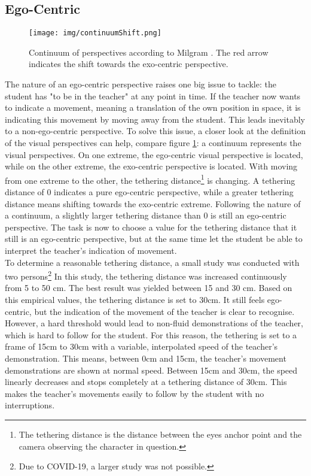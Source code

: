 \subsection{Ego-Centric}
\begin{figure}
	\centering
	\texttt{[image: img/continuumShift.png]}
	\caption{Continuum of perspectives according to Milgram \cite{Milgram1994}. The red arrow indicates the shift towards the exo-centric perspective.}
	\label{fig:continuumShift}
\end{figure}
The nature of an ego-centric perspective raises one big issue to tackle: the student has "to be in the teacher" at any point in time. If the teacher now wants to indicate a movement, meaning a translation of the own position in space, it is indicating this movement by moving away from the student. This leads inevitably to a non-ego-centric perspective. To solve this issue, a closer look at the definition of the visual perspectives can help, compare figure \ref{fig:continuumShift}: a continuum represents the visual perspectives. On one extreme, the ego-centric visual perspective is located, while on the other extreme, the exo-centric perspective is located. With moving from one extreme to the other, the tethering distance\footnote{The tethering distance is the distance between the eyes anchor point and the camera observing the character in question.} is changing. A tethering distance of 0 indicates a pure ego-centric perspective, while a greater tethering distance means shifting towards the exo-centric extreme. Following the nature of a continuum, a slightly larger tethering distance than 0 is still an ego-centric perspective. The task is now to choose a value for the tethering distance that it still is an ego-centric perspective, but at the same time let the student be able to interpret the teacher's indication of movement.\\
To determine a reasonable tethering distance, a small study was conducted with two persons\footnote{Due to COVID-19, a larger study was not possible.} In this study, the tethering distance was increased continuously from 5 to 50 cm. The best result was yielded between 15 and 30 cm. Based on this empirical values, the tethering distance is set to 30cm. It still feels ego-centric, but the indication of the movement of the teacher is clear to recognise. However, a hard threshold would lead to non-fluid demonstrations of the teacher, which is hard to follow for the student. For this reason, the tethering is set to a frame of 15cm to 30cm with a variable, interpolated speed of the teacher's demonstration. This means, between 0cm and 15cm, the teacher's movement demonstrations are shown at normal speed. Between 15cm and 30cm, the speed linearly decreases and stops completely at a tethering distance of 30cm. This makes the teacher's movements easily to follow by the student with no interruptions.\\
